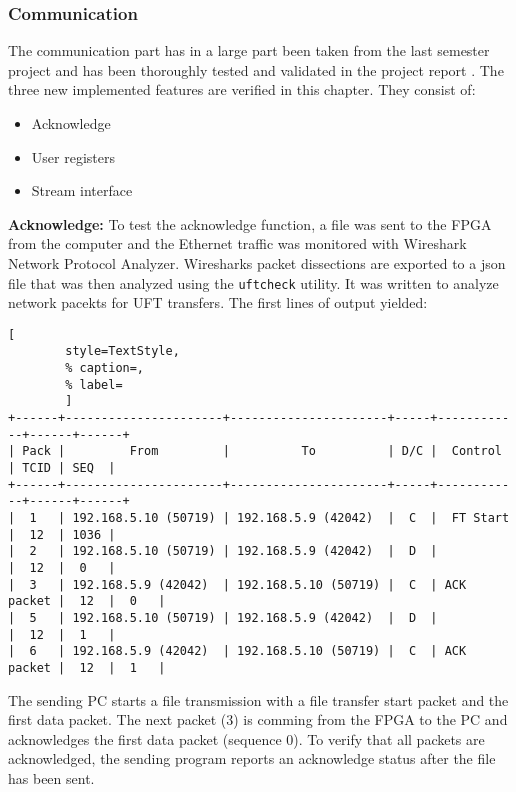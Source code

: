 \subsubsection*{Communication}
The communication part has in a large part been taken from the last semester project
and has been thoroughly tested and validated in the project report 
\cite{p5report}. The three new implemented features are verified in this
chapter. They consist of:
\begin{itemize}
    \item Acknowledge
    \item User registers
    \item Stream interface
\end{itemize}

\vspace{1ex}
\textbf{Acknowledge:} To test the acknowledge function, a file was sent to the
FPGA from the computer
and the Ethernet traffic was monitored with Wireshark Network Protocol Analyzer.
Wiresharks packet dissections are exported to a json file that was then analyzed
using the \texttt{uftcheck} utility. It was written to analyze network pacekts
for UFT transfers. The first lines of output yielded:

\vspace{1ex}
\begin{minipage}{1\linewidth}
    \begin{lstlisting}[
        style=TextStyle, 
        % caption=, 
        % label=
        ]
+------+----------------------+----------------------+-----+------------+------+------+
| Pack |         From         |          To          | D/C |  Control   | TCID | SEQ  | 
+------+----------------------+----------------------+-----+------------+------+------+
|  1   | 192.168.5.10 (50719) | 192.168.5.9 (42042)  |  C  |  FT Start  |  12  | 1036 |
|  2   | 192.168.5.10 (50719) | 192.168.5.9 (42042)  |  D  |            |  12  |  0   |
|  3   | 192.168.5.9 (42042)  | 192.168.5.10 (50719) |  C  | ACK packet |  12  |  0   |
|  5   | 192.168.5.10 (50719) | 192.168.5.9 (42042)  |  D  |            |  12  |  1   |
|  6   | 192.168.5.9 (42042)  | 192.168.5.10 (50719) |  C  | ACK packet |  12  |  1   |
\end{lstlisting}
\end{minipage}

\vspace{1ex}
The sending PC starts a file transmission with a file transfer start packet and
the first data packet. The next packet (3) is comming from the FPGA to the PC
and acknowledges the first data packet (sequence 0). To verify that all packets
are acknowledged, the sending program reports an acknowledge status after the
file has been sent. 

